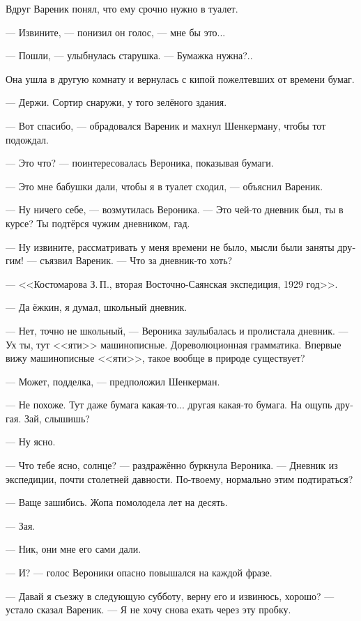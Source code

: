 \documentclass[a5paper,12pt,fleqn]{extbook}\usepackage{cooltooltips}\usepackage{polyglossia}\setdefaultlanguage[babelshorthands=true]{russian}\setotherlanguage{english}\defaultfontfeatures{Ligatures=TeX,Mapping=tex-text} \usepackage{xcolor}\definecolor{lightgray}{HTML}{bbbbbb}\color{lightgray}\newcommand{\ml}[3]{\textenglish{\textcolor{black}{#3}}}
\newcommand{\asterism}{\vspace{1em}{\centering\Large\bfseries$\ast~\ast~\ast$\par}\vspace{1em}}
\newcommand{\textspace}{\vspace{1em}{\centering\Large\bfseries<...>\par}\vspace{1em}}
\begin{document}
Вдруг Вареник понял, что ему срочно нужно в туалет.

--- Извините, --- понизил он голос, --- мне бы это...

--- Пошли, --- улыбнулась старушка.
--- Бумажка нужна?..

Она ушла в другую комнату и вернулась с кипой пожелтевших от времени бумаг.

--- Держи.
Сортир снаружи, у того зелёного здания.

--- Вот спасибо, --- обрадовался Вареник и махнул Шенкерману, чтобы тот подождал.

\textspace

\asterism

\textspace

--- Это что? --- поинтересовалась Вероника, показывая бумаги.

--- Это мне бабушки дали, чтобы я в туалет сходил, --- объяснил Вареник.

--- Ну ничего себе, --- возмутилась Вероника.
--- Это чей-то дневник был, ты в курсе?
Ты подтёрся чужим дневником, гад.

--- Ну извините, рассматривать у меня времени не было, мысли были заняты другим! --- съязвил Вареник.
--- Что за дневник-то хоть?

--- <<Костомарова З.\,П., вторая Восточно-Саянская экспедиция, 1929 год>>.

--- Да ёжкин, я думал, школьный дневник.

--- Нет, точно не школьный, --- Вероника заулыбалась и пролистала дневник.
--- Ух ты, тут <<яти>> машинописные.
Дореволюционная грамматика.
Впервые вижу машинописные <<яти>>, такое вообще в природе существует?

--- Может, подделка, --- предположил Шенкерман.

--- Не похоже.
Тут даже бумага какая-то... другая какая-то бумага.
На ощупь другая.
Зай, слышишь?

--- Ну ясно.

--- Что тебе ясно, солнце? --- раздражённо буркнула Вероника.
--- Дневник из экспедиции, почти столетней давности.
По-твоему, нормально этим подтираться?

--- Ваще зашибись.
Жопа помолодела лет на десять.

--- Зая.

--- Ник, они мне его сами дали.

--- И? --- голос Вероники опасно повышался на каждой фразе.

--- Давай я съезжу в следующую субботу, верну его и извинюсь, хорошо? --- устало сказал Вареник.
--- Я не хочу снова ехать через эту пробку.
\end{document}
